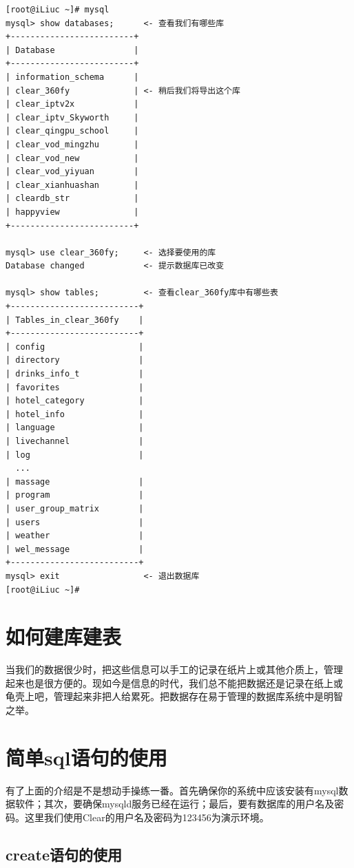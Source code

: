 \small{
\begin{verbatim}
[root@iLiuc ~]# mysql
mysql> show databases;      <- 查看我们有哪些库
+-------------------------+
| Database                |
+-------------------------+
| information_schema      | 
| clear_360fy             | <- 稍后我们将导出这个库 
| clear_iptv2x            | 
| clear_iptv_Skyworth     | 
| clear_qingpu_school     | 
| clear_vod_mingzhu       | 
| clear_vod_new           | 
| clear_vod_yiyuan        | 
| clear_xianhuashan       | 
| cleardb_str             | 
| happyview               | 
+-------------------------+

mysql> use clear_360fy;     <- 选择要使用的库
Database changed            <- 提示数据库已改变

mysql> show tables;         <- 查看clear_360fy库中有哪些表
+--------------------------+
| Tables_in_clear_360fy    |
+--------------------------+
| config                   | 
| directory                | 
| drinks_info_t            | 
| favorites                | 
| hotel_category           | 
| hotel_info               | 
| language                 | 
| livechannel              | 
| log                      | 
  ...         
| massage                  | 
| program                  | 
| user_group_matrix        | 
| users                    | 
| weather                  | 
| wel_message              | 
+--------------------------+
mysql> exit                 <- 退出数据库
[root@iLiuc ~]# 
\end{verbatim}
}
\normalsize

\section{如何建库建表}

当我们的数据很少时，把这些信息可以手工的记录在纸片上或其他介质上，管理
起来也是很方便的。现如今是信息的时代，我们总不能把数据还是记录在纸上或
龟壳上吧，管理起来非把人给累死。把数据存在易于管理的数据库系统中是明智
之举。

\section{简单sql语句的使用}

有了上面的介绍是不是想动手操练一番。首先确保你的系统中应该安装有mysql数
据软件；其次，要确保mysqld服务已经在运行；最后，要有数据库的用户名及密
码。这里我们使用Clear的用户名及密码为123456为演示环境。

\subsection{create语句的使用}

